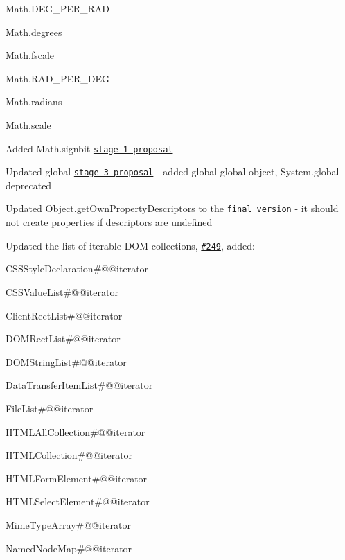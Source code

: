 \begin{DoxyItemize}
\begin{DoxyItemize}
\item {\ttfamily Math.\+D\+E\+G\+\_\+\+P\+E\+R\+\_\+\+R\+AD}
\item {\ttfamily Math.\+degrees}
\item {\ttfamily Math.\+fscale}
\item {\ttfamily Math.\+R\+A\+D\+\_\+\+P\+E\+R\+\_\+\+D\+EG}
\item {\ttfamily Math.\+radians}
\item {\ttfamily Math.\+scale}
\end{DoxyItemize}
\item Added {\ttfamily Math.\+signbit} \href{http://jfbastien.github.io/papers/Math.signbit.html}{\tt stage 1 proposal}
\item Updated {\ttfamily global} \href{https://github.com/tc39/proposal-global}{\tt stage 3 proposal} -\/ added {\ttfamily global} global object, {\ttfamily System.\+global} deprecated
\item Updated {\ttfamily Object.\+get\+Own\+Property\+Descriptors} to the \href{https://tc39.github.io/ecma262/2017/#sec-object.getownpropertydescriptors}{\tt final version} -\/ it should not create properties if descriptors are {\ttfamily undefined}
\item Updated the list of iterable D\+OM collections, \href{https://github.com/zloirock/core-js/issues/249}{\tt \#249}, added\+:
\begin{DoxyItemize}
\item {\ttfamily C\+S\+S\+Style\+Declaration\#@@iterator}
\item {\ttfamily C\+S\+S\+Value\+List\#@@iterator}
\item {\ttfamily Client\+Rect\+List\#@@iterator}
\item {\ttfamily D\+O\+M\+Rect\+List\#@@iterator}
\item {\ttfamily D\+O\+M\+String\+List\#@@iterator}
\item {\ttfamily Data\+Transfer\+Item\+List\#@@iterator}
\item {\ttfamily File\+List\#@@iterator}
\item {\ttfamily H\+T\+M\+L\+All\+Collection\#@@iterator}
\item {\ttfamily H\+T\+M\+L\+Collection\#@@iterator}
\item {\ttfamily H\+T\+M\+L\+Form\+Element\#@@iterator}
\item {\ttfamily H\+T\+M\+L\+Select\+Element\#@@iterator}
\item {\ttfamily Mime\+Type\+Array\#@@iterator}
\item {\ttfamily Named\+Node\+Map\#@@iterator}

\end{DoxyItemize}
\end{DoxyItemize}
